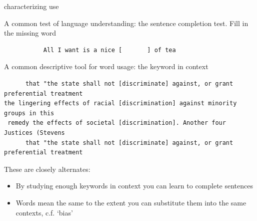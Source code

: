 \documentclass{hertieteaching}
\begin{document}
\begin{frame}[fragile]{characterizing use}

A common test of language understanding: the sentence completion test. Fill in the missing word

\small
\begin{verbatim}
           All I want is a nice [       ] of tea
\end{verbatim}
\normalsize
  
A common descriptive tool for word usage: the keyword in context

\begin{center}
\small
\begin{verbatim}
      that "the state shall not [discriminate] against, or grant preferential treatment
the lingering effects of racial [discrimination] against minority groups in this
 remedy the effects of societal [discrimination]. Another four Justices (Stevens
      that "the state shall not [discriminate] against, or grant preferential treatment
\end{verbatim}
\normalsize

\end{center}

 These are closely alternates:
 \begin{itemize}
  \item By studying enough keywords in context you can learn to complete sentences
  \item Words mean the same to the extent you can substitute them into the same contexts, c.f. `bias'
\end{itemize}

  
\end{frame}
\end{document}
